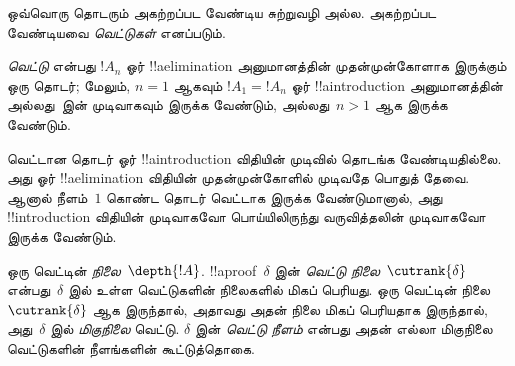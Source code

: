 \documentclass[../../../include/open-logic-section]{subfiles}
\begin{document}
ஒவ்வொரு தொடரும் அகற்றப்பட வேண்டிய சுற்றுவழி
அல்ல. அகற்றப்பட வேண்டியவை \emph{வெட்டுகள்}
எனப்படும்.

\begin{defn}
\emph{வெட்டு} என்பது $!A_n$ ஓர்
!!a{elimination} அனுமானத்தின் முதன்முன்கோளாக
இருக்கும் ஒரு தொடர்; மேலும், $n=1$ ஆகவும்
$!A_1 = !A_n$ ஓர் !!a{introduction}
அனுமானத்தின் அல்லது~\FalseInt இன் முடிவாகவும்
இருக்க வேண்டும், அல்லது~$n>1$ ஆக இருக்க வேண்டும்.
\end{defn}

வெட்டான தொடர் ஓர் !!a{introduction} விதியின்
முடிவில் தொடங்க வேண்டியதில்லை. அது ஓர்
!!a{elimination} விதியின் முதன்முன்கோளில்
முடிவதே பொதுத் தேவை. ஆனால் நீளம்~$1$
கொண்ட தொடர் வெட்டாக இருக்க வேண்டுமானால்,
அது !!{introduction} விதியின் முடிவாகவோ
பொய்யிலிருந்து வருவித்தலின் முடிவாகவோ இருக்க வேண்டும்.

\begin{defn}
ஒரு வெட்டின் \emph{நிலை}~$\depth{!A}$.
!!a{proof}~$\delta$ இன் \emph{வெட்டு
நிலை}~$\cutrank{\delta}$ என்பது~$\delta$
இல் உள்ள வெட்டுகளின் நிலைகளில் மிகப் பெரியது.
ஒரு வெட்டின் நிலை~$\cutrank{\delta}$
ஆக இருந்தால், அதாவது அதன் நிலை மிகப் பெரியதாக
இருந்தால், அது~$\delta$ இல்
\emph{மிகுநிலை} வெட்டு. $\delta$ இன்
\emph{வெட்டு நீளம்} என்பது அதன் எல்லா
மிகுநிலை வெட்டுகளின் நீளங்களின் கூட்டுத்தொகை.
\end{defn}
\end{document}
